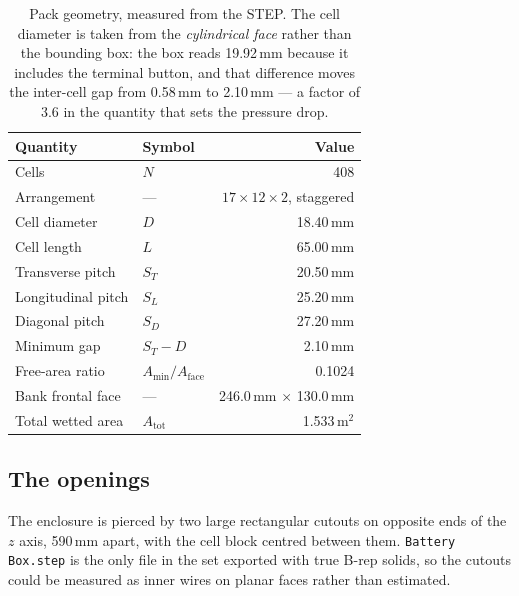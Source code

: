 \documentclass[11pt,a4paper]{article}
\newcommand{\qty}[2]{#1\,#2}
\begin{document}
\begin{table}[htbp]
\centering
\caption{Pack geometry, measured from the STEP. The cell diameter is taken from
the \emph{cylindrical face} rather than the bounding box: the box reads
\qty{19.92}{mm} because it includes the terminal button, and that
difference moves the inter-cell gap from \qty{0.58}{mm} to
\qty{2.10}{mm} --- a factor of 3.6 in the quantity that sets the
pressure drop.}
\label{tab:geom}
\small
\begin{tabular}{llr}
\toprule
\textbf{Quantity} & \textbf{Symbol} & \textbf{Value} \\
\midrule
Cells & $N$ & 408 \\
Arrangement & --- & $17 \times 12 \times 2$, staggered \\
Cell diameter & $D$ & \qty{18.40}{mm} \\
Cell length & $L$ & \qty{65.00}{mm} \\
Transverse pitch & $S_T$ & \qty{20.50}{mm} \\
Longitudinal pitch & $S_L$ & \qty{25.20}{mm} \\
Diagonal pitch & $S_D$ & \qty{27.20}{mm} \\
Minimum gap & $S_T - D$ & \qty{2.10}{mm} \\
Free-area ratio & $A_{\min}/A_{\mathrm{face}}$ & 0.1024 \\
Bank frontal face & --- & \qty{246.0}{mm} $\times$ \qty{130.0}{mm} \\
Total wetted area & $A_{\mathrm{tot}}$ & \qty{1.533}{m$^2$} \\
\bottomrule
\end{tabular}
\end{table}

\subsection{The openings}

The enclosure is pierced by two large rectangular cutouts on opposite ends of
the $z$ axis, \qty{590}{mm} apart, with the cell block centred between
them. \texttt{Battery Box.step} is the only file in the set exported with true
B-rep solids, so the cutouts could be measured as inner wires on planar faces
rather than estimated.
\end{document}
